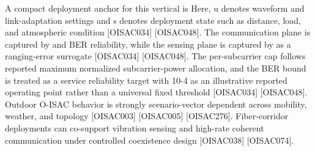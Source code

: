 {}
\markdownRendererSectionEnd \markdownRendererSectionBegin
{}\markdownRendererInterblockSeparator
{}A compact deployment anchor for this vertical is\markdownRendererInterblockSeparator
{}\markdownRendererInterblockSeparator
{}\markdownRendererInterblockSeparator
{}\markdownRendererInterblockSeparator
{}Here, u denotes waveform and link-adaptation settings and s denotes deployment state such as distance, load, and atmospheric condition [O\markdownRendererUnderscore{}ISAC\markdownRendererUnderscore{}034] [O\markdownRendererUnderscore{}ISAC\markdownRendererUnderscore{}048]. The communication plane is captured by  and BER reliability, while the sensing plane is captured by  as a ranging-error surrogate [O\markdownRendererUnderscore{}ISAC\markdownRendererUnderscore{}034] [O\markdownRendererUnderscore{}ISAC\markdownRendererUnderscore{}048]. The per-subcarrier cap  follows reported maximum normalized subcarrier-power allocation, and the BER bound is treated as a service reliability target with 10\markdownRendererCircumflex{}-4 as an illustrative reported operating point rather than a universal fixed threshold [O\markdownRendererUnderscore{}ISAC\markdownRendererUnderscore{}034] [O\markdownRendererUnderscore{}ISAC\markdownRendererUnderscore{}048].\markdownRendererParagraphSeparator
{}\markdownRendererInterblockSeparator
{}\markdownRendererUlBeginTight
\markdownRendererUlItem Outdoor O-ISAC behavior is strongly scenario-vector dependent across mobility, weather, and topology [O\markdownRendererUnderscore{}ISAC\markdownRendererUnderscore{}003] [O\markdownRendererUnderscore{}ISAC\markdownRendererUnderscore{}005] [O\markdownRendererUnderscore{}ISAC\markdownRendererUnderscore{}276].\markdownRendererUlItemEnd 
\markdownRendererUlItem Fiber-corridor deployments can co-support vibration sensing and high-rate coherent communication under controlled coexistence design [O\markdownRendererUnderscore{}ISAC\markdownRendererUnderscore{}038] [O\markdownRendererUnderscore{}ISAC\markdownRendererUnderscore{}074].\markdownRendererUlItemEnd 
